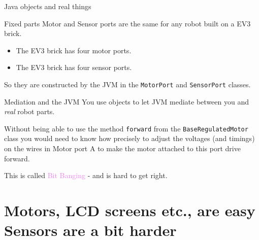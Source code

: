 \documentclass[color=pdftex,usenames,dvipsnames, aspectratio=169]{beamer}
\begin{document}
\begin{frame}{Java objects and real things}
\begin{block}{Fixed parts}
Motor and Sensor ports are the same for any robot built on a EV3 brick.
\begin{itemize}
\item The EV3 brick has \alert{four motor ports}.
\item The EV3 brick has \alert{four sensor ports}.
\end{itemize}
So they are constructed by the JVM in the \lstinline!MotorPort! and \lstinline!SensorPort! classes.
\end{block}

\begin{block}{Mediation and the JVM}
You use \alert{objects} to let JVM mediate between you and  \emph{real} robot parts.

Without being able to use the method \lstinline!forward! from the \lstinline!BaseRegulatedMotor! class  you would need to know how precisely to \alert{adjust the voltages (and timings) on the wires in Motor port A} to make the motor attached to this port drive forward.

This is called \textcolor{violet}{Bit Banging} - and is hard to get right. 
\end{block}
\end{frame}

\section{Motors, LCD screens etc., are easy\\ Sensors are a bit harder}
\end{document}
